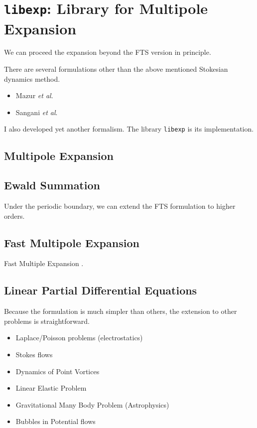\documentclass{book}
\begin{document}
\chapter{{\tt libexp}:
  Library for Multipole Expansion}
\label{chp:libexp}
We can proceed the expansion beyond the FTS version in principle.

There are several formulations other than the above mentioned
Stokesian dynamics method.
\begin{itemize}
\item Mazur {\it et al}.
\item Sangani {\it et al}.
\end{itemize}
I also developed yet another formalism.\cite{ichiki2002}
The library {\tt libexp} is its implementation.


\section{Multipole Expansion}


\section{Ewald Summation}
Under the periodic boundary,
we can extend the FTS formulation to higher orders.



\section{Fast Multipole Expansion}
Fast Multiple Expansion
\cite{greengard,greengard1987}.




\section{Linear Partial Differential Equations}
Because the formulation is much simpler than others,
the extension to other problems is straightforward.

\begin{itemize}
\item Laplace/Poisson problems (electrostatics)
\item Stokes flows
\item Dynamics of Point Vortices
\item Linear Elastic Problem
\item Gravitational Many Body Problem (Astrophysics)
\item Bubbles in Potential flows
\end{itemize}
\end{document}

